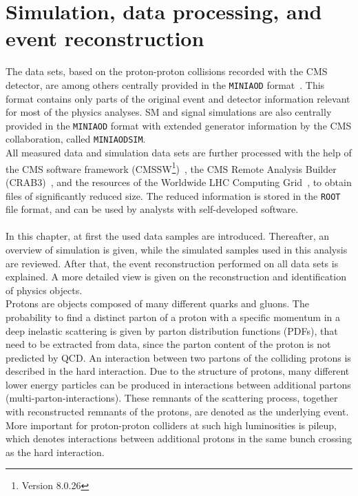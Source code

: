 \chapter{Simulation, data processing, and event reconstruction}\label{chap:reco}
\minitoc
The data sets, based on the proton-proton collisions recorded with the CMS detector, are among others centrally provided in the \texttt{MINIAOD} format~\cite{MiniAOD}. This format contains only parts of the original event and detector information relevant for most of the physics analyses. SM and signal simulations are also centrally provided in the \texttt{MINIAOD} format with extended generator information by the CMS collaboration, called \texttt{MINIAODSIM}.\\
All measured data and simulation data sets are further processed with the help of the CMS software framework (CMSSW\footnote{Version 8.0.26})~\cite{CMSSW}, the CMS Remote Analysis Builder (CRAB3)~\cite{CRAB}, and the resources of the Worldwide LHC Computing Grid~\cite{Grid}, to obtain files of significantly reduced size. The reduced information is stored in the \texttt{ROOT}~\cite{ROOT} file format, and can be used by analysts with self-developed software.\\
\\
In this chapter, at first the used data samples are introduced. Thereafter, an overview of simulation is given, while the simulated samples used in this analysis are reviewed. After that, the event reconstruction performed on all data sets is explained. A more detailed view is given on the reconstruction and identification of physics objects.\\

Protons are objects composed of many different quarks and gluons. The probability to find a distinct parton of a proton with a specific momentum in a deep inelastic scattering is given by parton distribution functions (PDFs)\cite{PDF}, that need to be extracted from data, since the parton content of the proton is not predicted by QCD.
An interaction between two partons of the colliding protons is described in the hard interaction. Due to the structure of protons, many different lower energy particles can be produced in interactions between additional partons (multi-parton-interactions). These remnants of the scattering process, together with reconstructed remnants of the protons, are denoted as the underlying event. More important for proton-proton colliders at such high luminosities is pileup, which denotes interactions between additional protons in the same bunch crossing as the hard interaction.

